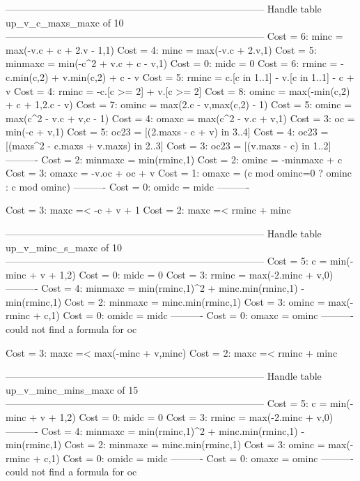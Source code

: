 --------------------------------------------------------------------------------
Handle table up_v_c_maxs_maxc of 10
--------------------------------------------------------------------------------
Cost =  6:  minc    = max(-v.c + c + 2.v - 1,1)
Cost =  4:  minc    = max(-v.c + 2.v,1)
Cost =  5:  minmaxc = min(-c^2 + v.c + c - v,1)
Cost =  0:  midc    = 0
Cost =  6:  rminc   = -c.min(c,2) + v.min(c,2) + c - v
Cost =  5:  rminc   = c.[c in 1..1] - v.[c in 1..1] - c + v
Cost =  4:  rminc   = -c.[c >= 2] + v.[c >= 2]
Cost =  8:  ominc   = max(-min(c,2) + c + 1,2.c - v)
Cost =  7:  ominc   = max(2.c - v,max(c,2) - 1)
Cost =  5:  ominc   = max(c^2 - v.c + v,c - 1)
Cost =  4:  omaxc   = max(c^2 - v.c + v,1)
Cost =  3:  oc      = min(-c + v,1)
Cost =  5:  oc23    = [(2.maxs - c + v) in 3..4]
Cost =  4:  oc23    = [(maxs^2 - c.maxs + v.maxs) in 2..3]
Cost =  3:  oc23    = [(v.maxs - c) in 1..2]
----------
Cost =  2:  minmaxc = min(rminc,1)
Cost =  2:  ominc   = -minmaxc + c
Cost =  3:  omaxc   = -v.oc + oc + v
Cost =  1:  omaxc   = (c mod ominc=0 ? ominc : c mod ominc)
----------
Cost =  0:  omidc   = midc
----------

Cost =  3:  maxc =< -c + v + 1
Cost =  2:  maxc =< rminc + minc

--------------------------------------------------------------------------------
Handle table up_v_minc_s_maxc of 10
--------------------------------------------------------------------------------
Cost =  5:  c       = min(-minc + v + 1,2)
Cost =  0:  midc    = 0
Cost =  3:  rminc   = max(-2.minc + v,0)
----------
Cost =  4:  minmaxc = min(rminc,1)^2 + minc.min(rminc,1) - min(rminc,1)
Cost =  2:  minmaxc = minc.min(rminc,1)
Cost =  3:  ominc   = max(-rminc + c,1)
Cost =  0:  omidc   = midc
----------
Cost =  0:  omaxc   = ominc
----------
could not find a formula for oc

Cost =  3:  maxc =< max(-minc + v,minc)
Cost =  2:  maxc =< rminc + minc

--------------------------------------------------------------------------------
Handle table up_v_minc_mins_maxc of 15
--------------------------------------------------------------------------------
Cost =  5:  c       = min(-minc + v + 1,2)
Cost =  0:  midc    = 0
Cost =  3:  rminc   = max(-2.minc + v,0)
----------
Cost =  4:  minmaxc = min(rminc,1)^2 + minc.min(rminc,1) - min(rminc,1)
Cost =  2:  minmaxc = minc.min(rminc,1)
Cost =  3:  ominc   = max(-rminc + c,1)
Cost =  0:  omidc   = midc
----------
Cost =  0:  omaxc   = ominc
----------
could not find a formula for oc

